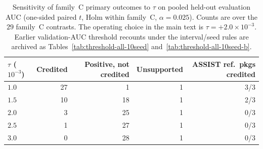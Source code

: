 \begin{table}[tbp]
\caption{Sensitivity of family~C primary outcomes to $\tau$ on
pooled held-out evaluation AUC (one-sided paired $t$, Holm within
family~C, $\alpha{=}0.025$). Counts are over the $29$ family~C contrasts.
The operating choice in the main text is $\tau{=}{+}2.0\times 10^{-3}$.
Earlier validation-AUC threshold recounts under the interval/seed
rules are archived as Tables~\ref{tab:threshold-all-10seed}
and~\ref{tab:threshold-all-10seed-b}.}
\label{tab:credit-primary-tau}
\centering
\footnotesize
\begin{tabular}{@{}lrrrr@{}}
\toprule
$\tau$ ($10^{-3}$) & Credited & Positive, not credited & Unsupported & ASSIST ref.\ pkgs credited \\
\midrule
$1.0$ & 27 & 1 & 1 & 3/3 \\
$1.5$ & 10 & 18 & 1 & 2/3 \\
$2.0$ & 3 & 25 & 1 & 0/3 \\
$2.5$ & 1 & 27 & 1 & 0/3 \\
$3.0$ & 0 & 28 & 1 & 0/3 \\
\bottomrule
\end{tabular}
\end{table}

